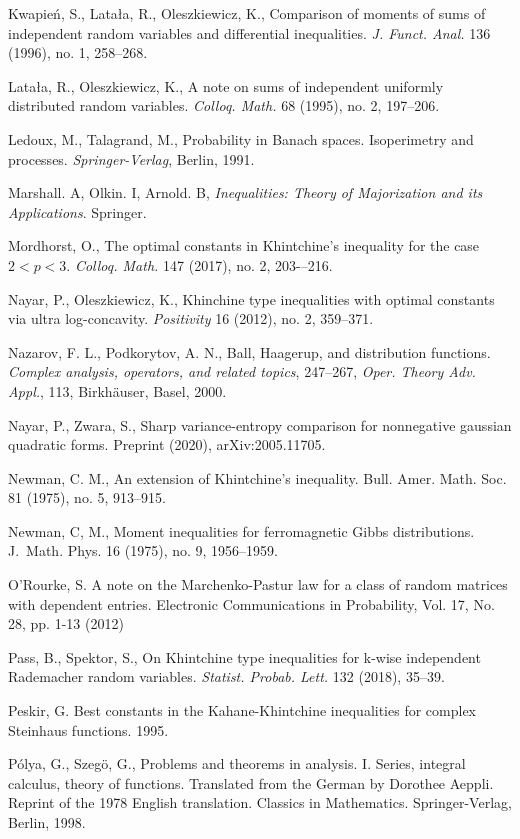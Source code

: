 \documentclass[10pt]{article}
\newcommand{\1}{\textbf{1}}
\theoremstyle{remark}
\theoremstyle{definition}
\begin{document}
\begin{thebibliography}{9}
 Kwapie\'n, S., Lata\l a, R., Oleszkiewicz, K.,
Comparison of moments of sums of independent random variables and differential inequalities.
\emph{J. Funct. Anal.} 136 (1996), no. 1, 258--268. 

 Lata\l a, R., Oleszkiewicz, K.,
A note on sums of independent uniformly distributed random variables. 
\emph{Colloq. Math.} 68 (1995), no. 2, 197--206. 

Ledoux, M., Talagrand, M., Probability in Banach spaces. Isoperimetry and processes. \emph{Springer-Verlag}, Berlin, 1991.

 Marshall. A, Olkin. I, Arnold. B, \textit{Inequalities: Theory of Majorization and its Applications}. Springer.

 Mordhorst, O.,
The optimal constants in Khintchine's inequality for the case $2<p<3$.
\emph{Colloq. Math.} 147 (2017), no. 2, 203-–216.

 Nayar, P., Oleszkiewicz, K.,
Khinchine type inequalities with optimal constants via ultra log-concavity.
\emph{Positivity} 16 (2012), no. 2, 359--371. 

 Nazarov, F. L., Podkorytov, A. N.,
Ball, Haagerup, and distribution functions.
\emph{Complex analysis, operators, and related topics}, 247--267, 
\emph{Oper. Theory Adv. Appl.}, 113, Birkh\"auser, Basel, 2000. 

Nayar, P., Zwara, S.,
Sharp variance-entropy comparison for nonnegative gaussian quadratic forms. Preprint (2020), arXiv:2005.11705.

 Newman, C. M.,
An extension of Khintchine's inequality.
Bull. Amer. Math. Soc. 81 (1975), no. 5, 913--915.

 Newman, C, M.,
Moment inequalities for ferromagnetic Gibbs distributions. J.~Math. Phys. 16 (1975), no. 9, 1956--1959.

 O'Rourke, S. A note on the Marchenko-Pastur law for  a class of random matrices with dependent entries. Electronic Communications in Probability, Vol. 17, No. 28, pp. 1-13 (2012)

 Pass, B., Spektor, S.,
On Khintchine type inequalities for k-wise independent Rademacher random variables.
\emph{Statist. Probab. Lett.} 132 (2018), 35--39.

Peskir, G. Best constants in the Kahane-Khintchine inequalities for complex Steinhaus functions. 1995.

P\'olya, G., Szeg\"o, G., 
Problems and theorems in analysis. I. Series, integral calculus, theory of functions. Translated from the German by Dorothee Aeppli. Reprint of the 1978 English translation. Classics in Mathematics. Springer-Verlag, Berlin, 1998.


\end{thebibliography}
\end{document}
